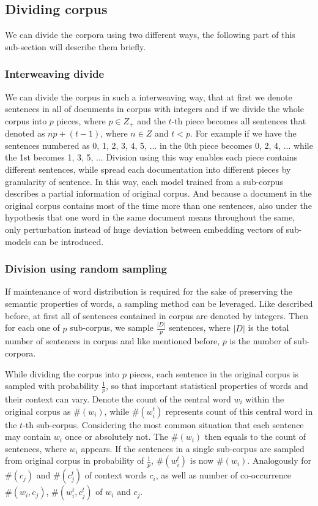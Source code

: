 \subsection{Dividing corpus}\label{sec:division}
	We can divide the corpora using two different ways, the following part of this sub-section will describe them briefly.
	
	\subsubsection{Interweaving divide}
	We can divide the corpus in such a interweaving way, that at first we denote sentences in all of documents in corpus with integers and if we divide the whole corpus into $p$ pieces, where $p\in Z_+$ and the $t$-th piece becomes all sentences that denoted as $np+(t-1)$, where $n\in Z$ and $t<p$. For example if we have the sentences numbered as 0, 1, 2, 3, 4, 5, ... in the 0th piece becomes 0, 2, 4, ... while the 1st becomes 1, 3, 5, ... Division using this way enables each piece contains different sentences, while spread each documentation into different pieces by granularity of sentence. In this way, each model trained from a sub-corpus describes a partial information of original corpus. And because a document in the original corpus contains most of the time more than one sentences, also under the hypothesis that one word in the same document means throughout the same, only perturbation instead of huge deviation between embedding vectors of sub-models can be introduced.
	
	\subsubsection{Division using random sampling}\label{sss:random_sampling}
	If maintenance of word distribution is required for the sake of preserving the semantic properties of words, a sampling method can be leveraged. Like described before, at first all of sentences contained in corpus are denoted by integers. Then for each one of $p$ sub-corpus, we sample $\frac{|D|}{p}$ sentences, where $|D|$ is the total number of sentences in corpus and like mentioned before, $p$ is the number of sub-corpora.

	While dividing the corpus into $p$ pieces, each sentence in the original corpus is sampled with probability $\frac{1}{p}$, so that important statistical properties of words and their context can vary. Denote the count of the central word $w_i$ within the original corpus as $\#(w_i)$, while $\#(w_i^t)$ represents count of this central word in the $t$-th sub-corpus. Considering the most common situation that each sentence may contain $w_i$ once or absolutely not. The $\#(w_i)$ then equals to the count of sentences, where $w_i$ appears. If the sentences in a single sub-corpus are sampled from original corpus in probability of $\frac{1}{p}$, $\#(w_i^t)$ is now $\#(w_i)$. Analogously for $\#(c_j)$ and $\#(c_j^t)$ of context words $c_i$, as well as number of co-occurrence $\#(w_i, c_j)$, $\#(w_i^t, c_j^t)$ of $w_i$ and $c_j$.
